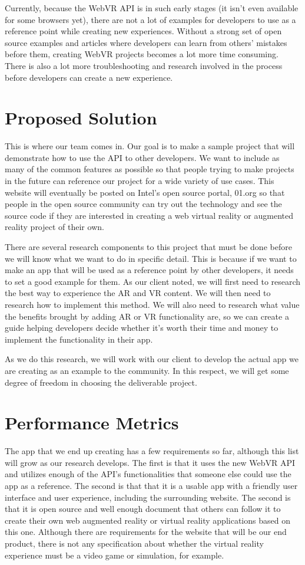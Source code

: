 \documentclass[10pt,peerreview]{IEEEtran}
\begin{document}
Currently, because the WebVR API is in such early stages (it isn’t even available for some browsers yet), there are not a lot of examples for developers to use as a reference point while creating new experiences. Without a strong set of open source examples and articles where developers can learn from others’ mistakes before them, creating WebVR projects becomes a lot more time consuming. There is also a lot more troubleshooting and research involved in the process before developers can create a new experience. 

\section{Proposed Solution}
This is where our team comes in. Our goal is to make a sample project that will demonstrate how to use the API to other developers. We want to include as many of the common features as possible so that people trying to make projects in the future can reference our project for a wide variety of use cases. This website will eventually be posted on Intel’s open source portal, 01.org so that people in the open source community can try out the technology and see the source code if they are interested in creating a web virtual reality or augmented reality project of their own. 

There are several research components to this project that must be done before we will know what we want to do in specific detail. This is because if we want to make an app that will be used as a reference point by other developers, it needs to set a good example for them. As our client noted, we will first need to research the best way to experience the AR and VR content. We will then need to research how to implement this method. We will also need to research what value the benefits brought by adding AR or VR functionality are, so we can create a guide helping developers decide whether it’s worth their time and money to implement the functionality in their app. 

As we do this research, we will work with our client to develop the actual app we are creating as an example to the community. In this respect, we will get some degree of freedom in choosing the deliverable project. 

\section{Performance Metrics}
The app that we end up creating has a few requirements so far, although this list will grow as our research develops. The first is that it uses the new WebVR API and utilizes enough of the API’s functionalities that someone else could use the app as a reference. The second is that that it is a usable app with a friendly user interface and user experience, including the surrounding website. The second is that it is open source and well enough document that others can follow it to create their own web augmented reality or virtual reality applications based on this one. Although there are requirements for the website that will be our end product, there is not any specification about whether the virtual reality experience must be a video game or simulation, for example.
\end{document}
